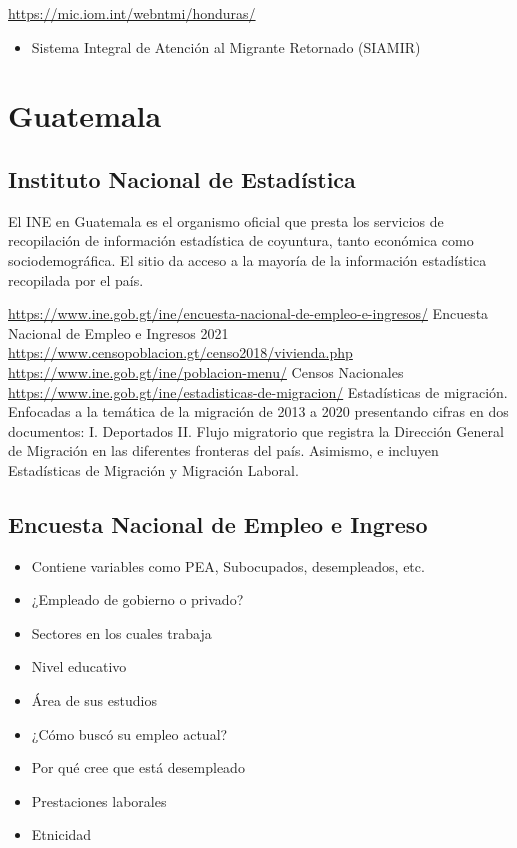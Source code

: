 \documentclass[
]{book}
\providecommand{\tightlist}{%
  \setlength{\itemsep}{0pt}\setlength{\parskip}{0pt}}
\begin{document}
\url{https://mic.iom.int/webntmi/honduras/}

\begin{itemize}
\tightlist
\item
  Sistema Integral de Atención al Migrante Retornado (SIAMIR)
\end{itemize}

\hypertarget{guatemala}{%
\section{Guatemala}\label{guatemala}}

\hypertarget{instituto-nacional-de-estaduxedstica-1}{%
\subsection{Instituto Nacional de Estadística}\label{instituto-nacional-de-estaduxedstica-1}}

El INE en Guatemala es el organismo oficial que presta los servicios de recopilación de información estadística de coyuntura, tanto económica como sociodemográfica. El sitio da acceso a la mayoría de la información estadística recopilada por el país.

\url{https://www.ine.gob.gt/ine/encuesta-nacional-de-empleo-e-ingresos/} Encuesta Nacional de Empleo e Ingresos 2021
\url{https://www.censopoblacion.gt/censo2018/vivienda.php}
\url{https://www.ine.gob.gt/ine/poblacion-menu/} Censos Nacionales
\url{https://www.ine.gob.gt/ine/estadisticas-de-migracion/} Estadísticas de migración. Enfocadas a la temática de la migración de 2013 a 2020 presentando cifras en dos documentos: I. Deportados II. Flujo migratorio que registra la Dirección General de Migración en las diferentes fronteras del país. Asimismo, e incluyen Estadísticas de Migración y Migración Laboral.

\hypertarget{encuesta-nacional-de-empleo-e-ingreso}{%
\subsection{Encuesta Nacional de Empleo e Ingreso}\label{encuesta-nacional-de-empleo-e-ingreso}}

\begin{itemize}
\tightlist
\item
  Contiene variables como PEA, Subocupados, desempleados, etc.
\item
  ¿Empleado de gobierno o privado?
\item
  Sectores en los cuales trabaja
\item
  Nivel educativo
\item
  Área de sus estudios
\item
  ¿Cómo buscó su empleo actual?
\item
  Por qué cree que está desempleado
\item
  Prestaciones laborales
\item
  Etnicidad
\end{itemize}
\end{document}
